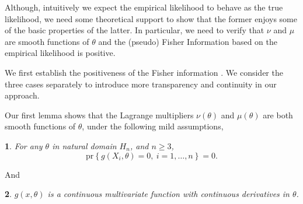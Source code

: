 \documentclass[oneside,english]{amsbook}
\numberwithin{section}{chapter}
\numberwithin{equation}{section}
\numberwithin{figure}{section}
\theoremstyle{plain}
\theoremstyle{plain}
\newtheorem{assumption}{\protect\assumptionname}
\theoremstyle{definition}
\theoremstyle{plain}
\theoremstyle{plain}
\theoremstyle{remark}
\theoremstyle{definition}
\theoremstyle{definition}
\providecommand{\assumptionname}{Assumption}
\begin{document}
Although, intuitively we expect the empirical likelihood to behave
as the true likelihood, we need some theoretical support to show that
the former enjoys some of the basic properties of the latter. In particular,
we need to verify that $\nu$ and $\mu$ are smooth functions of $\theta$
and the (pseudo) Fisher Information based on the empirical likelihood
is positive. 

We first establish the positiveness of the Fisher information . We
consider the three cases separately to introduce more transparency
and continuity in our approach. 

Our first lemma shows that the Lagrange multipliers $\nu\left(\theta\right)$
and $\mu\left(\theta\right)$ are both smooth functions of $\theta$, under the following mild assumptions,
\begin{assumption}
\label{ass:denom-not-zero} 
For any $\theta$ in natural domain $H_n$, and $n\ge 3$,
\[
	\mathrm{pr}\left\{ g(X_i,\theta)=0, \: i=1,\ldots,n \right\}=0.
\]
\end{assumption}
And 
\begin{assumption}
\label{ass:first-order-smooth-g}
$g(x,\theta)$ is a continuous multivariate function with continuous derivatives in $\theta$.
\end{assumption}
\end{document}
